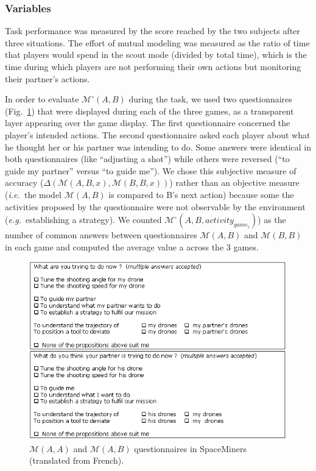 \documentclass[twocolumn]{article}
\newcommand{\ie}{{\textit{i.e.\ }}}
\newcommand{\eg}{{\textit{e.g.\ }}}
\newcommand{\M}[3]{{\mathcal{M}(#1, #2, #3)}}
\newcommand{\gmodel}[2]{{$\mathcal{M}(#1, #2)$}}
\newcommand{\Model}[3]{{$\mathcal{M}^{\circ}(#1, #2, #3)$}}
\newcommand{\gModel}[2]{{$\mathcal{M}^{\circ}(#1, #2)$}}
\begin{document}
\subsubsection*{Variables}

Task performance was measured by the score reached by the two subjects after
three situations. The effort of mutual modeling was measured as the ratio of
time that players would spend in the scout mode (divided by total time), which
is the time during which players are not performing their own actions but
monitoring their partner's actions.

In order to evaluate \gModel{A}{B} during the task, we used two questionnaires
(Fig.~\ref{study1:questionnaires}) that were displayed during each of the three
games, as a transparent layer appearing over the game display. The first
questionnaire concerned the player's intended actions. The second questionnaire
asked each player about what he thought her or his partner was intending to do.
Some answers were identical in both questionnaires (like ``adjusting a shot'')
while others were reversed (``to guide my partner'' versus ``to guide me''). We
chose this subjective measure of accuracy ($\Delta(\M{A}{B}{x}, \M{B}{B}{x})$)
rather than an objective measure (\ie the model \gmodel{A}{B} is compared to B's
next action) because some the activities proposed by the questionnaire were not
observable by the environment (\eg establishing a strategy). We counted
\Model{A}{B}{activity_{game_{i}}}) as the number of common answers between
questionnaires \gmodel{A}{B} and \gmodel{B}{B} in each game and computed the
average value a across the 3 games.

\begin{figure}[ht!]
        \centering
        \includegraphics[width=\columnwidth]{image5.png}
        \caption{\gmodel{A}{A} and \gmodel{A}{B} questionnaires in SpaceMiners
        (translated from French).}

        \label{study1:questionnaires}
\end{figure}
\end{document}
